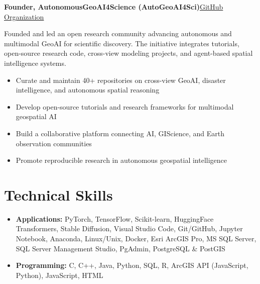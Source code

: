\documentclass[10pt,letterpaper]{article}
\newcommand{\entry}[2]{%
  \par\vspace{0.30em}\noindent\textbf{#1}\hfill{\small #2}\par}
\newenvironment{tight}
  {\begin{itemize}[leftmargin=1.25em,itemsep=0.10em,topsep=0.20em,parsep=0pt,label=\textbullet]}
  {\end{itemize}}
\newenvironment{plainlist}
  {\begin{itemize}[leftmargin=1.1em,itemsep=0.10em,topsep=0.20em,parsep=0pt,label={}]}
  {\end{itemize}}
\begin{document}
\entry{Founder, AutonomousGeoAI4Science (AutoGeoAI4Sci)}{\href{https://github.com/AutoGeoAI4Sci}{GitHub Organization}}
\vspace{0.15em}
Founded and led an open research community advancing autonomous and multimodal GeoAI for scientific discovery. The initiative integrates tutorials, open-source research code, cross-view modeling projects, and agent-based spatial intelligence systems.
\begin{tight}
  \item Curate and maintain 40+ repositories on cross-view GeoAI, disaster intelligence, and autonomous spatial reasoning
  \item Develop open-source tutorials and research frameworks for multimodal geospatial AI
  \item Build a collaborative platform connecting AI, GIScience, and Earth observation communities
  \item Promote reproducible research in autonomous geospatial intelligence
\end{tight}

\section{Technical Skills}

\begin{plainlist}
  \item \textbf{Applications:} PyTorch, TensorFlow, Scikit-learn, HuggingFace Transformers, Stable Diffusion, Visual Studio Code, Git/GitHub, Jupyter Notebook, Anaconda, Linux/Unix, Docker, Esri ArcGIS Pro, MS SQL Server, SQL Server Management Studio, PgAdmin, PostgreSQL \& PostGIS
  \item \textbf{Programming:} C, C++, Java, Python, SQL, R, ArcGIS API (JavaScript, Python), JavaScript, HTML
\end{plainlist}
\end{document}
